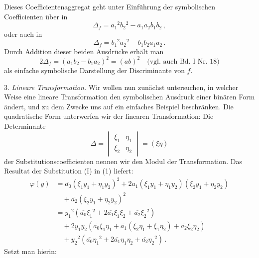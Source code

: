 Dieses Coefficientenaggregat geht unter Einführung der symbolischen Coefficienten über in
\[
\Delta_f = a_1{}^2b_2{}^2 - a_1a_2b_1b_2\,,
\]
oder auch in
\[
\Delta_f = b_1{}^2a_2{}^2 - b_1b_2a_1a_2\,.
\]
Durch Addition dieser beiden Ausdrücke erhält man
\[
2\Delta_f = (a_1b_2 - b_1a_2)^2 = (ab)^2 \quad \text{(vgl. auch Bd. I Nr. 18)}
\]
als einfache symbolische Darstellung der Discriminante von $f$.

3. \textit{Lineare Transformation.} Wir wollen nun zunächst untersuchen, in welcher Weise eine lineare Transformation den symbolischen Ausdruck einer binären Form ändert, und zu dem Zwecke uns auf ein einfaches Beispiel beschränken. Die quadratische Form
unterwerfen wir der linearen Transformation:
Die Determinante
\[
\Delta = \begin{vmatrix} \xi_1 & \eta_1 \\ \xi_2 & \eta_2 \end{vmatrix} = (\xi\eta)
\]
der Substitutionscoefficienten nennen wir den \glqq Modul\grqq{} der Transformation. Das Resultat der Substitution (I) in (1) liefert:
\[
\begin{aligned}
\varphi(y) &= \overline{a_0}(\xi_1y_1+\eta_1y_2)^2 + 2a_1(\xi_1y_1+\eta_1y_2)(\xi_2y_1+\eta_2y_2) %
\\
&\quad + \overline{a_2}(\xi_2y_1+\eta_2y_2)^2 \\
&= y_1{}^2(\overline{a_0}\xi_1{}^2 + 2\overline{a_1}\xi_1\xi_2 + \overline{a_2}\xi_2{}^2) \\
&\quad + 2y_1y_2(\overline{a_0}\xi_1\eta_1 + \overline{a_1}(\xi_2\eta_1+\xi_1\eta_2) + \overline{a_2}\xi_2\eta_2) \\
&\quad + y_2{}^2(\overline{a_0}\eta_1{}^2 + 2\overline{a_1}\eta_1\eta_2 + \overline{a_2}\eta_2{}^2)\,.
\end{aligned}
\]
Setzt man hierin:
